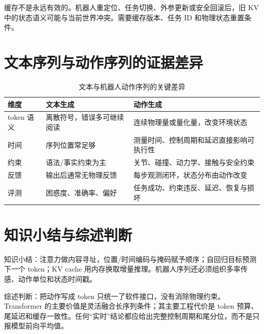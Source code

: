 缓存不是永远有效的。机器人重定位、任务切换、外参更新或安全回滚后，旧 KV 中的状态语义可能与当前世界冲突。需要缓存版本、任务 ID 和物理状态重置条件。

\section{文本序列与动作序列的证据差异}

\begin{table}[H]
\centering
\caption{文本与机器人动作序列的关键差异}
\label{tab:text-action-sequence-differences}
\begin{tabularx}{\textwidth}{p{}YY}
\toprule
维度 & 文本生成 & 动作生成 \\
\midrule
token 语义 & 离散符号，错误多可继续阅读 & 连续物理量或量化量，改变环境状态 \\
时间 & 序列位置常足够 & 测量时间、控制周期和延迟直接影响可执行性 \\
约束 & 语法/事实约束为主 & 关节、碰撞、动力学、接触与安全约束 \\
反馈 & 输出后通常无物理反馈 & 每步观测闭环，状态分布由动作改变 \\
评测 & 困惑度、准确率、偏好 & 任务成功、约束违反、延迟、恢复与损坏 \\
\bottomrule
\end{tabularx}
\end{table}

\section{知识小结与综述判断}

知识小结：注意力做内容寻址，位置/时间编码与掩码赋予顺序；自回归目标预测下一个 token；KV cache 用内存换取增量推理。机器人序列还必须组织多率传感、动作单位和状态时间戳。

综述判断：把动作写成 token 只统一了软件接口，没有消除物理约束。Transformer 的主要价值是灵活融合长序列条件；其主要工程代价是 token 预算、尾延迟和缓存一致性。任何“实时”结论都应给出完整控制周期和尾分位，而不是只报模型前向平均值。
